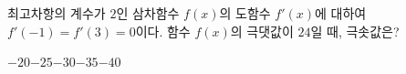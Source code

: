 최고차항의 계수가 $2$인 삼차함수 $f(x)$의 도함수 $f'(x)$에 대하여 $f'(-1)=f'(3)=0$이다. 함수 $f(x)$의 극댓값이 $24$일 때, 극솟값은?
\begin{choices32}{$-20$}{$-25$}{$-30$}{$-35$}{$-40$}\end{choices32}
